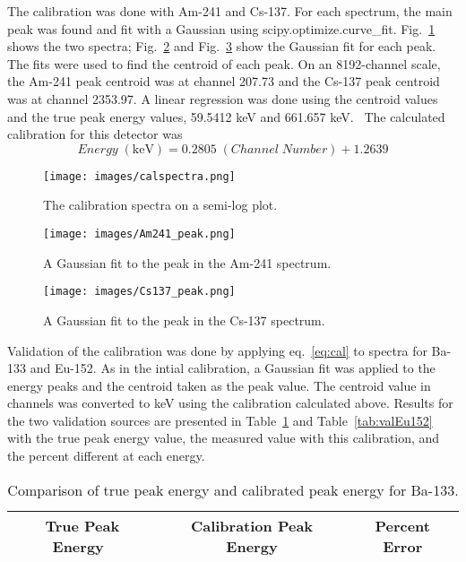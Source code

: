 The calibration was done with Am-241 and Cs-137. For each spectrum, the main peak was found and fit with a Gaussian using scipy.optimize.curve\_fit. Fig.~\ref{fig:calspectra} shows the two spectra; Fig.~\ref{fig:Am241peak} and Fig.~\ref{fig:Cs137peak} show the Gaussian fit for each peak. The fits were used to find the centroid of each peak. On an 8192-channel scale, the Am-241 peak centroid was at channel 207.73 and the Cs-137 peak centroid was at channel 2353.97. A linear regression was done using the centroid values and the true peak energy values, 59.5412 keV and 661.657 keV.~\cite{lblndata} The calculated calibration for this detector was
\begin{equation}
  \label{eq:cal} 
  Energy \; \mathrm{ (keV)} = 0.2805 \; (Channel \; Number) + 1.2639 
\end{equation}

\begin{figure}[H]
  \centering
  \texttt{[image: images/calspectra.png]} 
  \caption{The calibration spectra on a semi-log plot.} 
  \label{fig:calspectra} 
\end{figure}
 
\begin{figure}[H]
  \centering
  \texttt{[image: images/Am241\_peak.png]} 
  \caption{A Gaussian fit to the peak in the Am-241 spectrum.} 
  \label{fig:Am241peak} 
\end{figure}

\begin{figure}[H]
  \centering
  \texttt{[image: images/Cs137\_peak.png]} 
  \caption{A Gaussian fit to the peak in the Cs-137 spectrum.} 
  \label{fig:Cs137peak} 
\end{figure}

Validation of the calibration was done by applying eq.~\ref{eq:cal} to spectra for Ba-133 and Eu-152. As in the intial calibration, a Gaussian fit was applied to the energy peaks and the centroid taken as the peak value. The centroid value in channels was converted to keV using the calibration calculated above. Results for the two validation sources are presented in Table~\ref{tab:valBa133} and Table~\ref{tab:valEu152} with the true peak energy value, the measured value with this calibration, and the percent different at each energy.

\begin{table}[H]
  \centering 
  \caption{Comparison of true peak energy and calibrated peak energy for Ba-133.} 
  \begin{tabular}{|ccc|} 
    \hline 
    True Peak Energy~\cite{lblndata} & Calibration Peak Energy & Percent Error \\ 
    \hline 
    
    \hline  
  \end{tabular} 
  \label{tab:valBa133}
\end{table} 

